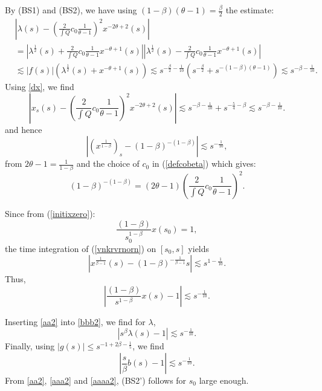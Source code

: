 \documentclass[11pt,a4paper,reqno]{amsart}
\theoremstyle{remark}
\numberwithin{equation}{section}
\newcommand{\be}{\begin{equation}}
\newcommand{\ee}{\end{equation}}
\def\fref#1{{\rm (\ref{#1})}}
\def\fref#1{{\rm (\ref{#1})}}
\def\l{\lambda}
\begin{document}
By (BS1) and (BS2), we have using $(1-\beta)(\theta-1) =\frac \beta 2$ the estimate:
\begin{align}
& \left| \l (s) -  \left(\frac 2 {\int Q} c_0 \frac {1}{\theta-1}\right)^2  {x^{-2 \theta+2}(s)} \right| \label{bbb2}\\ &=
\left| \l^{\frac 12} (s) + \frac 2 {\int Q} c_0 \frac {1}{\theta-1} {x^{-\theta+1}(s)}\right| \left|  \l^{\frac 12} (s) - \frac 2 {\int Q} c_0 \frac {1}{\theta-1} {x^{-\theta+1}(s)}\right|\nonumber \\
&\lesssim |f(s)| \left( \l^{\frac 12} (s)+x^{-\theta+1}(s)\right)
\lesssim s^{-\frac \beta 2 - \frac 1{10} } \left( s^{-\frac \beta 2} + s^{-(1-\beta)(\theta-1)}\right) \lesssim s^{-  \beta   - \frac 1{10}}.\nonumber
\end{align}
Using \eqref{dx}, we find
$$
\left| x_s (s) -  \left(\frac 2 {\int Q} c_0 \frac {1}{\theta-1}\right)^2  {x^{-2 \theta+2}(s)} \right| 
\lesssim   s^{-  \beta   - \frac 1{10}} + s^{-\frac 54 -   \beta }
\lesssim s^{-  \beta   - \frac 1{10}}.
$$
and hence\be
\label{vnkrvrnorn}
\left| \left(x^{\frac 1{1-\beta}}\right)_s - (1-\beta)^{-(1-\beta)} \right| \lesssim s^{-\frac 1{10}},
\ee
from $2\theta-1=\frac 1{1-\beta}$ 
and the choice of   $c_0$  in \fref{defcobeta} which gives:
$$
(1-\beta)^{-(1-\beta)}= (2\theta-1)\left(\frac 2 {\int Q} c_0 \frac {1}{\theta-1}\right)^2. 
$$

Since from \fref{initixzero}:
$$
 \frac {(1-\beta) }{s_0^{1-\beta}} x (s_0)=  1,$$
the time integration of \fref{vnkrvrnorn} on $[s_0,s]$ yields
$$
\left|x^{\frac 1{\beta-1}}(s) -  (1-\beta)^{-\frac 1{\beta-1}} s \right| \lesssim s^{1-\frac 1{10}}.
$$
Thus,     
 \be\label{aa2}
\left|  \frac {(1-\beta)}{s^{1-\beta}}  x (s) - 1\right| \lesssim s^{-\frac 1{10}}.
 \ee
 
 Inserting \eqref{aa2} into \eqref{bbb2}, we find for $\l$,
\be\label{aaa2}
\left|  s^{\beta} \l(s) -1\right|  \lesssim s^{-\frac 1{10}}.
\ee
Finally, using $|g(s)| \leq s^{-1 + 2 \beta - \frac 1{5}}$,
we find
\be\label{aaaa2}
\left| \frac {s}{\beta } b(s) -1\right|  \lesssim s^{-\frac 1{10}}.
\ee
From \eqref{aa2}, \eqref{aaa2} and \eqref{aaaa2}, (BS2') follows for $s_0$ large enough.
 
\end{document}
